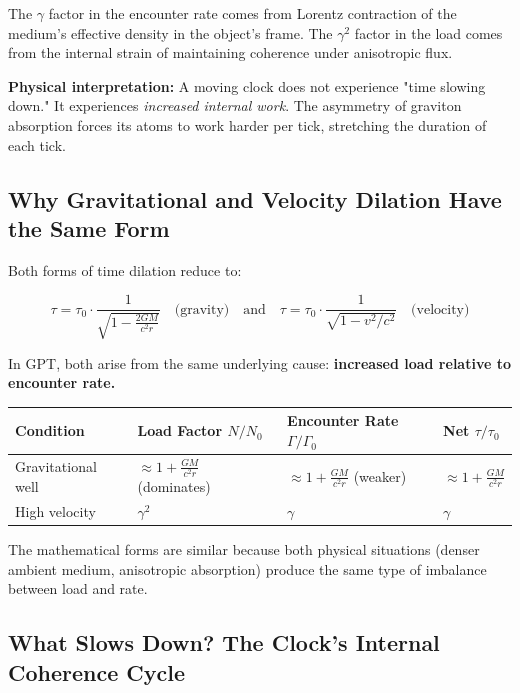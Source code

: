 \documentclass[12pt, a4paper]{article}
\begin{document}
The \( \gamma \) factor in the encounter rate comes from Lorentz contraction of the medium's effective density in the object's frame. The \( \gamma^2 \) factor in the load comes from the internal strain of maintaining coherence under anisotropic flux.

\textbf{Physical interpretation:} A moving clock does not experience "time slowing down." It experiences \textit{increased internal work}. The asymmetry of graviton absorption forces its atoms to work harder per tick, stretching the duration of each tick.

\subsection{Why Gravitational and Velocity Dilation Have the Same Form}
\label{subsec:dilation_unification}

Both forms of time dilation reduce to:

\[
\tau = \tau_0 \cdot \frac{1}{\sqrt{1 - \frac{2GM}{c^2 r}}} \quad \text{(gravity)} \quad \text{and} \quad \tau = \tau_0 \cdot \frac{1}{\sqrt{1 - v^2/c^2}} \quad \text{(velocity)}
\]

In GPT, both arise from the same underlying cause: \textbf{increased load relative to encounter rate.}

\begin{center}
\begin{tabular}{|p{4cm}|p{3cm}|p{3cm}|p{3cm}|}
\hline
\textbf{Condition} & \textbf{Load Factor \( N/N_0 \)} & \textbf{Encounter Rate \( \Gamma/\Gamma_0 \)} & \textbf{Net \( \tau/\tau_0 \)} \\
\hline
Gravitational well & \( \approx 1 + \frac{GM}{c^2 r} \) (dominates) & \( \approx 1 + \frac{GM}{c^2 r} \) (weaker) & \( \approx 1 + \frac{GM}{c^2 r} \) \\
\hline
High velocity & \( \gamma^2 \) & \( \gamma \) & \( \gamma \) \\
\hline
\end{tabular}
\end{center}

The mathematical forms are similar because both physical situations (denser ambient medium, anisotropic absorption) produce the same type of imbalance between load and rate.

\subsection{What Slows Down? The Clock's Internal Coherence Cycle}
\label{subsec:clock_coherence}
\end{document}
